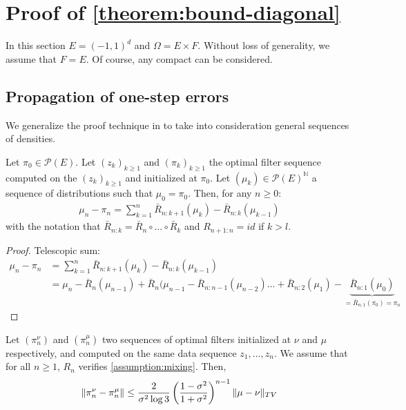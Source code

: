 \section{Proof of \cref{theorem:bound-diagonal}}\label{sec:proof-bound}
In this section $E = (-1, 1)^d$ and $\Omega = E \times F$. Without loss of generality, we assume that $F=E$. Of course, any compact can be considered.

\subsection{Propagation of one-step errors}

We generalize the proof technique in \cite{oudjane} to take into consideration general sequences of densities.

\begin{proposition}
Let $\pi_0\in\mathcal P(E)$. Let $(z_k)_{k\geq 1}$ and $(\pi_k)_{k\geq 1}$ the optimal filter sequence computed on the $(z_k)_{k\geq 1}$ and initialized at $\pi_0$. Let $(\mu_k)\in\mathcal P(E)^\mathbb N$ a sequence of distributions such that $\mu_0 = \pi_0$. Then, for any $n\geq 0$:
\begin{align}\label{eq:telescopic}
    \mu_n - \pi_n = \sum_{k=1}^n \bar R_{n:k+1}(\mu_k) - \bar R_{n:k}(\mu_{k-1})
\end{align}
with the notation that $\bar R_{n:k} = \bar R_n \circ \dots \circ \bar R_k$ and $R_{n+1:n}=id$ if $k > l$.
\end{proposition}
\begin{proof}
    Telescopic sum:
\begin{align}
    \mu_n - \pi_n &= \sum_{k=1}^n \bar R_{n:k+1}(\mu_k) - \bar R_{n:k}(\mu_{k-1})\\
    &= \mu_n - \bar R_n(\mu_{n-1}) + \bar R_{n}(\mu_{n-1} - \bar R_{n:n-1}(\mu_{n-2}) \ldots + \bar R_{n:2}(\mu_1) - \underbrace{\bar R_{n:1}(\mu_0)}_{=\bar R_{n:1}(\pi_0)=\pi_n}
\end{align}
\end{proof}



\begin{proposition}\label{prop:optimal-forgetting}
Let $(\pi_n^\nu)$ and $(\pi_n^\mu)$ two sequences of optimal filters initialized at $\nu$ and $\mu$ respectively, and computed on the same data sequence $z_1, \ldots, z_n$. We assume that for all $n\geq 1$, $R_n$ verifies \cref{assumption:mixing}. Then,
\begin{align}
    \Vert \pi^\nu_n - \pi^\mu_n \Vert \leq \frac{2}{\sigma^2\log 3}\left(\frac{1 - \sigma^2}{1 + \sigma^2}\right)^{n-1}\Vert \mu - \nu \Vert_{TV}
\end{align}
\end{proposition}

